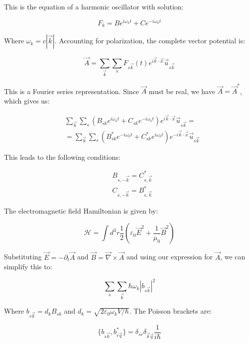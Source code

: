 This is the equation of a harmonic oscillator with solution:

\begin{equation}
F_k=Be^{i\omega_k t}+Ce^{-i\omega_k t}
\end{equation}

Where $\omega_k=c|\vec{k}|$. Accounting for polarization, the complete vector potential is:

\begin{equation}
\vec{A}=\sum_{\vec{k}}\sum_s F_{s\vec{k}}(t)e^{i\vec{k}\cdot\vec{x}}\vec{u}_{s\vec{k}}
\end{equation}


This is a Fourier series representation. Since $\vec{A}$ must be real, we have $\vec{A}=\vec{A}^*$, which gives us:

\begin{align}
&\sum_{\vec{k}}\sum_s(B_{sk}e^{i\omega_k t}+C_{sk}e^{-i\omega_k t})e^{i\vec{k}\cdot\vec{x}}\vec{u}_{s\vec{k}}=\\
&=\sum_{\vec{k}}\sum_s(B_{sk}^*e^{-i\omega_k t}+C_{sk}^*e^{i\omega_k t})e^{-i\vec{k}\cdot\vec{x}}\vec{u}_{s\vec{k}}
\end{align}

This leads to the following conditions:

\begin{align}
&B_{s,-\vec{k}}=C_{s,\vec{k}}^* \\
&C_{s,-\vec{k}}=B_{s,\vec{k}}^*
\end{align}

The electromagnetic field Hamiltonian is given by:

\begin{equation}
\mathcal{H}=\int d^3r\frac{1}{2}\left(\varepsilon_0\vec{E}^2+\frac{1}{\mu_0}\vec{B}^2\right)
\end{equation}

Substituting $\vec{E}=-\partial_t\vec{A}$ and $\vec{B}=\vec{\nabla}\times\vec{A}$ and using our expression for $\vec{A}$, we can simplify this to:

\begin{equation}
\sum_s\sum_{\vec{k}}\hbar\omega_k|b_{s\vec{k}}|^2
\end{equation}

Where $b_{s\vec{k}}=d_kB_{sk}$ and $d_k=\sqrt{2\varepsilon_0\omega_kV/\hbar}$. The Poisson brackets are:

\begin{equation}
\{b_{s\vec{k}},b_{r\vec{q}}^*\}=\delta_{sr}\delta_{\vec{k}\vec{q}}\frac{1}{i\hbar}
\end{equation}

